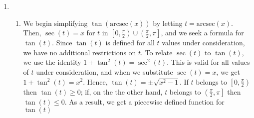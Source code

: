 \documentclass[12pt]{ximera}
\begin{document}
\begin{example}
\begin{enumerate}
\begin{enumerate}
\item  Once again, Theorem \ref{arcsecantcosecantfunctionprops1} comes to our aid giving $\mbox{arccsc}(-2) = \arcsin\left(-\frac{1}{2}\right) = -\frac{\pi}{6}$.


\item  Since $\frac{5\pi}{4}$ doesn't fall between $0$ and $\frac{\pi}{2}$ or $\frac{\pi}{2}$ and $\pi$, we cannot use the inverse property stated in Theorem \ref{arcsecantcosecantfunctionprops1}.  We can, nevertheless, begin by working `inside out' which yields  $\mbox{arcsec}\left( \sec\left( \frac{5\pi}{4} \right) \right) = \mbox{arcsec}(-\sqrt{2}) = \arccos\left(-\frac{\sqrt{2}}{2}\right) = \frac{3\pi}{4}$.

\item   One way to begin to simplify $\cot\left(\mbox{arccsc}\left(-3\right)\right)$ is to let $t = \mbox{arccsc}(-3)$.  Then,  $\csc(t) = -3$ and, since this is negative, we have that $t$ lies in the interval  $\left[ -\frac{\pi}{2},0\right)$.  We are after $\cot\left(\mbox{arccsc}\left(-3\right)\right) = \cot(t)$, so we use the Pythagorean Identity $1 + \cot^{2}(t) = \csc^{2}(t)$.  Substituting, we have $1 + \cot^{2}(t) = (-3)^2$, or $\cot(t) = \pm \sqrt{8} = \pm 2 \sqrt{2}$.  Since $-\frac{\pi}{2} \leq t < 0$, $\cot(t) < 0$, so we get  $\cot\left(\mbox{arccsc}\left(-3\right)\right) = -2\sqrt{2}$.

\end{enumerate}

\item 

\begin{enumerate}


\item  We begin simplifying  $\tan(\mbox{arcsec}(x))$ by letting $t = \mbox{arcsec}(x)$.  Then, $\sec(t) = x$ for $t$ in $\left[0, \frac{\pi}{2}\right) \cup \left(\frac{\pi}{2}, \pi \right]$, and we seek a formula for $\tan(t)$.  Since $\tan(t)$ is defined for all $t$ values under consideration, we have no additional restrictions on $t$.  To relate $\sec(t)$ to $\tan(t)$, we use the identity $1 + \tan^{2}(t) = \sec^{2}(t)$.  This is valid for all values of $t$ under consideration, and when we substitute $\sec(t) = x$, we get $1 + \tan^{2}(t) = x^2$.  Hence, $\tan(t) = \pm \sqrt{x^2-1}$.  If $t$ belongs to $\left[0, \frac{\pi}{2}\right)$ then $\tan(t) \geq 0$;  if, on the the other hand, $t$ belongs to  $\left(\frac{\pi}{2}, \pi \right]$ then $\tan(t) \leq 0$. As a result, we get a piecewise defined function for $\tan(t)$


\end{enumerate}
\end{enumerate}
\end{example}
\end{document}
